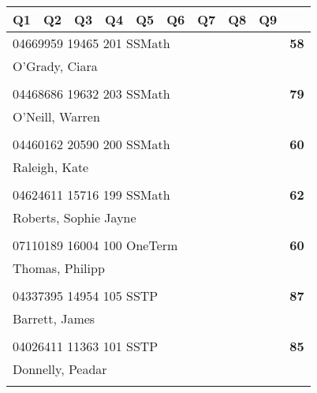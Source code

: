 \documentclass[a4paper,12pt]{article}
\begin{document}
\begin{tabular}{
   |p{9mm}|
    p{9mm}|
    p{9mm}|
    p{9mm}|
    p{9mm}|
    p{9mm}|
    p{9mm}|
    p{9mm}|
    p{9mm}|
    p{9mm}|}
\hline\hline
Q1 & Q2 & Q3 & Q4 & Q5 & Q6 & Q7 & Q8 & Q9 &     \\
\hline\hline
\multicolumn{9}{|l|}{04669959 19465 201 SSMath} & \textbf{58} \\
\hline
\multicolumn{10}{|l|}{O'Grady, Ciara} \\
\hline
   \vrule height8mm width0pt depth2mm 
      &    &    &    &    &    &    &    &    &     \\
\hline\hline
\multicolumn{9}{|l|}{04468686 19632 203 SSMath} & \textbf{79} \\
\hline
\multicolumn{10}{|l|}{O'Neill, Warren} \\
\hline
   \vrule height8mm width0pt depth2mm 
      &    &    &    &    &    &    &    &    &     \\
\hline\hline
\multicolumn{9}{|l|}{04460162 20590 200 SSMath} & \textbf{60} \\
\hline
\multicolumn{10}{|l|}{Raleigh, Kate} \\
\hline
   \vrule height8mm width0pt depth2mm 
      &    &    &    &    &    &    &    &    &     \\
\hline\hline
\multicolumn{9}{|l|}{04624611 15716 199 SSMath} & \textbf{62} \\
\hline
\multicolumn{10}{|l|}{Roberts, Sophie Jayne} \\
\hline
   \vrule height8mm width0pt depth2mm 
      &    &    &    &    &    &    &    &    &     \\
\hline\hline
\multicolumn{9}{|l|}{07110189 16004 100 OneTerm} & \textbf{60} \\
\hline
\multicolumn{10}{|l|}{Thomas, Philipp} \\
\hline
   \vrule height8mm width0pt depth2mm 
      &    &    &    &    &    &    &    &    &     \\
\hline\hline
\multicolumn{9}{|l|}{04337395 14954 105 SSTP} & \textbf{87} \\
\hline
\multicolumn{10}{|l|}{Barrett, James} \\
\hline
   \vrule height8mm width0pt depth2mm 
      &    &    &    &    &    &    &    &    &     \\
\hline\hline
\multicolumn{9}{|l|}{04026411 11363 101 SSTP} & \textbf{85} \\
\hline
\multicolumn{10}{|l|}{Donnelly, Peadar} \\
\hline
   \vrule height8mm width0pt depth2mm 

\end{tabular}
\end{document}
